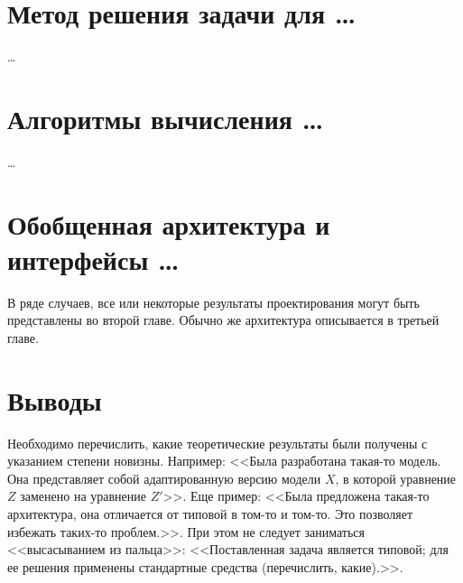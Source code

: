 \section{Метод решения задачи для \dots}

\dots





\section{Алгоритмы вычисления \dots}

\dots





\section{Обобщенная архитектура и интерфейсы \dots}

В ряде случаев, все или некоторые результаты проектирования могут быть представлены во второй главе. Обычно же архитектура описывается в третьей главе.

\section{Выводы}

Необходимо перечислить, какие теоретические результаты были получены с 
указанием степени новизны. Например: <<Была разработана такая-то модель. Она 
представляет собой адаптированную версию модели $X$, в которой уравнение $Z$ 
заменено на уравнение $Z'$>>. Еще пример: <<Была предложена такая-то 
архитектура, она отличается от типовой в том-то и том-то. Это позволяет 
избежать таких-то проблем.>>. При этом не следует заниматься <<высасыванием из 
пальца>>: <<Поставленная задача является типовой; для ее решения применены 
стандартные средства (перечислить, какие).>>.
